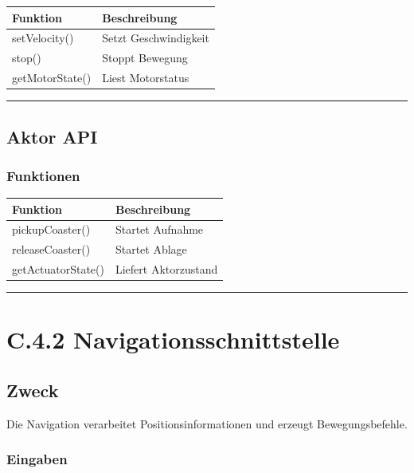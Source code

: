 \documentclass[
  a4paper,
  12pt,
  DIV=12,        %
  parskip=half,  %
  headings=small %
]{scrartcl}
\theoremstyle{definition}
\theoremstyle{definition}
\begin{document}
\begin{longtable}[]{@{}ll@{}}
\toprule\noalign{}
Funktion & Beschreibung \\
\midrule\noalign{}
\endhead
\bottomrule\noalign{}
\endlastfoot
setVelocity() & Setzt Geschwindigkeit \\
stop() & Stoppt Bewegung \\
getMotorState() & Liest Motorstatus \\
\end{longtable}

\begin{center}\rule{0.5\linewidth}{0.5pt}\end{center}

\subsection{Aktor API}\label{aktor-api}

\subsubsection{Funktionen}\label{funktionen-7}

\begin{longtable}[]{@{}ll@{}}
\toprule\noalign{}
Funktion & Beschreibung \\
\midrule\noalign{}
\endhead
\bottomrule\noalign{}
\endlastfoot
pickupCoaster() & Startet Aufnahme \\
releaseCoaster() & Startet Ablage \\
getActuatorState() & Liefert Aktorzustand \\
\end{longtable}

\begin{center}\rule{0.5\linewidth}{0.5pt}\end{center}

\section{C.4.2
Navigationsschnittstelle}\label{c.4.2-navigationsschnittstelle}

\subsection{Zweck}\label{zweck-6}

Die Navigation verarbeitet Positionsinformationen und erzeugt
Bewegungsbefehle.

\subsubsection{Eingaben}\label{eingaben-1}
\end{document}
